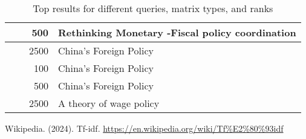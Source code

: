 \documentclass[a4paper, 12pt]{article}
\begin{document}
\begin{table}[htbp]
\begin{tabularx}{\textwidth}{|>{\raggedright\arraybackslash}p{2cm}|>{\raggedright\arraybackslash}p{2.25cm}|r|>{\raggedright\arraybackslash}X|}
        \cline{3-4}
        & & 500 & Rethinking Monetary -Fiscal policy coordination \\
        \cline{3-4}
        & & 2500 & China's Foreign Policy \\
        \cline{2-4}
        & \multirow{3}{*}{\makecell[l]{TF-IDF}} & 
        100 & China's Foreign Policy \\
        \cline{3-4}
        & & 500 & China's Foreign Policy \\
        \cline{3-4}
        & & 2500 & A theory of wage policy \\
        \hline
    \end{tabularx}
    \caption{Top results for different queries, matrix types, and ranks}
    \label{tab:results}
\end{table}

\newpage
\begin{thebibliography}{1}
 Wikipedia. (2024). Tf-idf. \url{https://en.wikipedia.org/wiki/Tf%E2%80%93idf}
\end{thebibliography}
\end{document}
